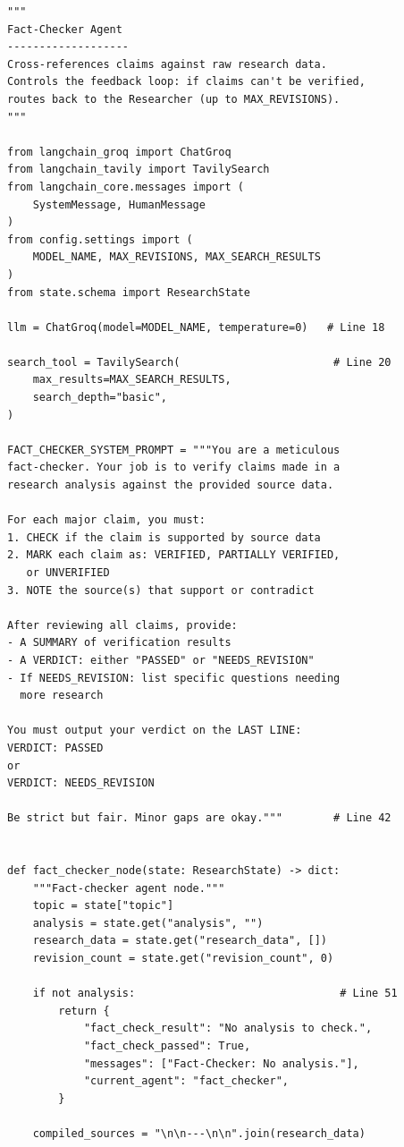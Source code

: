 \documentclass[12pt, a4paper]{article}
\begin{document}
\begin{lstlisting}[style=pythonstyle, title={\color{accentgreen}\faIcon{file} agents/fact\_checker.py --- Full Code (107 lines)}]
"""
Fact-Checker Agent
-------------------
Cross-references claims against raw research data.
Controls the feedback loop: if claims can't be verified,
routes back to the Researcher (up to MAX_REVISIONS).
"""

from langchain_groq import ChatGroq
from langchain_tavily import TavilySearch
from langchain_core.messages import (
    SystemMessage, HumanMessage
)
from config.settings import (
    MODEL_NAME, MAX_REVISIONS, MAX_SEARCH_RESULTS
)
from state.schema import ResearchState

llm = ChatGroq(model=MODEL_NAME, temperature=0)   # Line 18

search_tool = TavilySearch(                        # Line 20
    max_results=MAX_SEARCH_RESULTS,
    search_depth="basic",
)

FACT_CHECKER_SYSTEM_PROMPT = """You are a meticulous
fact-checker. Your job is to verify claims made in a
research analysis against the provided source data.

For each major claim, you must:
1. CHECK if the claim is supported by source data
2. MARK each claim as: VERIFIED, PARTIALLY VERIFIED,
   or UNVERIFIED
3. NOTE the source(s) that support or contradict

After reviewing all claims, provide:
- A SUMMARY of verification results
- A VERDICT: either "PASSED" or "NEEDS_REVISION"
- If NEEDS_REVISION: list specific questions needing
  more research

You must output your verdict on the LAST LINE:
VERDICT: PASSED
or
VERDICT: NEEDS_REVISION

Be strict but fair. Minor gaps are okay."""        # Line 42


def fact_checker_node(state: ResearchState) -> dict:
    """Fact-checker agent node."""
    topic = state["topic"]
    analysis = state.get("analysis", "")
    research_data = state.get("research_data", [])
    revision_count = state.get("revision_count", 0)

    if not analysis:                                # Line 51
        return {
            "fact_check_result": "No analysis to check.",
            "fact_check_passed": True,
            "messages": ["Fact-Checker: No analysis."],
            "current_agent": "fact_checker",
        }

    compiled_sources = "\n\n---\n\n".join(research_data)


\end{lstlisting}
\end{document}
